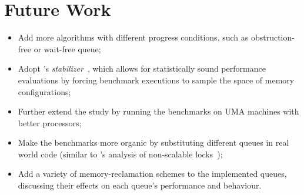 \section{Future Work}
\begin{itemize}
\item Add more algorithms with different progress conditions, such as
obstruction-free or wait-free queue;
\item Adopt \citeauthor{curtsinger2013stabilizer}'s \emph{stabilizer}~\citep{curtsinger2013stabilizer}, which allows
for statistically sound performance evaluations by forcing benchmark executions
to sample the space of memory configurations;
\item Further extend the study by running the benchmarks on UMA machines with
better processors;
\item Make the benchmarks more organic by substituting different queues in real
world code (similar to \citeauthor{boyd2012non}'s analysis of non-scalable locks~\citep{boyd2012non});
\item Add a variety of memory-reclamation schemes to the implemented queues,
discussing their effects on each queue's performance and behaviour.
\end{itemize}
